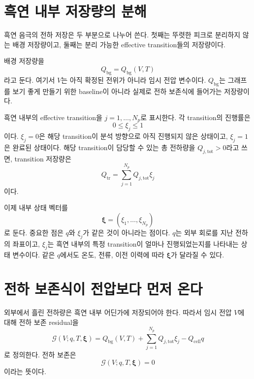 \documentclass[11pt,a4paper]{article}
\newcommand{\cell}{\mathrm{cell}}
\newcommand{\bg}{\mathrm{bg}}
\newcommand{\tot}{\mathrm{tot}}
\begin{document}
\section{흑연 내부 저장량의 분해}

흑연 음극의 전하 저장은 두 부분으로 나누어 쓴다. 첫째는 뚜렷한 피크로 분리하지 않는 배경 저장량이고, 둘째는 분리 가능한 effective transition들의 저장량이다.

배경 저장량을
\begin{equation}
Q_{\bg}=Q_{\bg}(V,T)
\label{eq:qbg_definition}
\end{equation}
라고 둔다. 여기서 \(V\)는 아직 확정된 전위가 아니라 임시 전압 변수이다. \(Q_{\bg}\)는 그래프를 보기 좋게 만들기 위한 baseline이 아니라 실제로 전하 보존식에 들어가는 저장량이다.

흑연 내부의 effective transition을 \(j=1,\ldots,N_p\)로 표시한다. 각 transition의 진행률은
\begin{equation}
0\le \xi_j\le 1
\label{eq:xi_bounds}
\end{equation}
이다. \(\xi_j=0\)은 해당 transition이 분석 방향으로 아직 진행되지 않은 상태이고, \(\xi_j=1\)은 완료된 상태이다. 해당 transition이 담당할 수 있는 총 전하량을 \(Q_{j,\tot}>0\)라고 쓰면, transition 저장량은
\begin{equation}
Q_{\mathrm{tr}}=\sum_{j=1}^{N_p}Q_{j,\tot}\xi_j
\label{eq:transition_storage}
\end{equation}
이다.

이제 내부 상태 벡터를
\begin{equation}
\bm{\xi}=(\xi_1,\ldots,\xi_{N_p})
\label{eq:xi_vector_ch1}
\end{equation}
로 둔다. 중요한 점은 \(q\)와 \(\xi_j\)가 같은 것이 아니라는 점이다. \(q\)는 외부 회로를 지난 전하의 좌표이고, \(\xi_j\)는 흑연 내부의 특정 transition이 얼마나 진행되었는지를 나타내는 상태 변수이다. 같은 \(q\)에서도 온도, 전류, 이전 이력에 따라 \(\bm{\xi}\)가 달라질 수 있다.

\section{전하 보존식이 전압보다 먼저 온다}

외부에서 흘린 전하량은 흑연 내부 어딘가에 저장되어야 한다. 따라서 임시 전압 \(V\)에 대해 전하 보존 residual을
\begin{equation}
\mathcal{G}(V;q,T,\bm{\xi})
=
Q_{\bg}(V,T)
+\sum_{j=1}^{N_p}Q_{j,\tot}\xi_j
-Q_{\cell}q
\label{eq:residual_definition}
\end{equation}
로 정의한다. 전하 보존은
\begin{equation}
\mathcal{G}(V;q,T,\bm{\xi})=0
\label{eq:residual_zero}
\end{equation}
이라는 뜻이다.
\end{document}
